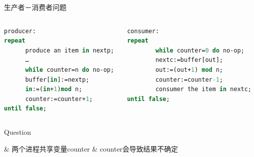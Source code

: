 \begin{frame}[fragile]{生产者－消费者问题}
  \begin{columns}[onlytextwidth,T]
    \begin{column}{0.48\textwidth}
      \begin{lstlisting}[tabsize=8,keywordstyle=\color{red},basicstyle=\small, language=Pascal]
producer:
repeat
      produce an item in nextp;
      …
      while counter=n do no-op;
      buffer[in]:=nextp;
      in:=(in+1)mod n;
      counter:=counter+1;
until false; \end{lstlisting}
    \end{column}
    \begin{column}{0.5\textwidth}
      \begin{lstlisting}[tabsize=8,keywordstyle=\color{red},basicstyle=\small, language=Pascal]
consumer:
repeat
        while counter=0 do no-op;
        nextc:=buffer[out];
        out:=(out+1) mod n;
        counter:=counter-1;
        consumer the item in nextc;
until false; \end{lstlisting}
    \end{column}
  \end{columns}
\end{frame}


\begin{frame}[fragile]{Question}
  \begin{easylist} \easyitem
    & 两个进程共享变量counter
    & counter会导致结果不确定
  \end{easylist}
\end{frame}

